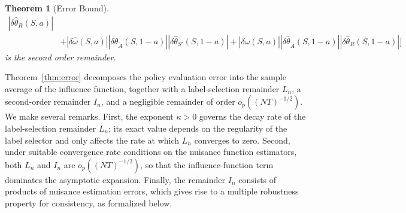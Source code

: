 \documentclass[12pt]{article}
\newcommand{\0}{\boldsymbol{0}}
\newtheorem{theorem}{Theorem}
\newcommand{\ZB}[1]{{\color{cyan}{ #1}}}
\begin{document}
\begin{theorem}[Error Bound]
\begin{align*}
|\delta\widehat\theta_R(S,a)| \\
&+
|\delta\widehat\omega(S,a)|
|\delta\widehat\theta_{\widetilde A}(S,1-a)|
|\delta\widehat\theta_{S'}(S,1-a)|
+
|\delta\widehat\omega(S,a)|
|\delta\widehat\theta_{\widetilde A}(S,1-a)|
|\delta\widehat\theta_R(S,1-a)|
\Big] 
\end{align*}
is the second order remainder.
\end{theorem}

Theorem~\ref{thm:error} decomposes the policy evaluation error into the sample average of the influence function, together with a label-selection remainder $L_n$, a second-order remainder $I_n$, and a negligible remainder of order $o_p((NT)^{-1/2})$. We make several remarks. First, the exponent $\kappa>0$ governs the decay rate of the label-selection remainder $L_n$; its exact value depends on the regularity of the label selector and only affects the rate at which $L_n$ converges to zero. Second, under suitable convergence rate conditions on the nuisance function estimators, both $L_n$ and $I_n$ are $o_p((NT)^{-1/2})$, so that the influence-function term dominates the asymptotic expansion. Finally, the remainder $I_n$ consists of products of nuisance estimation errors, which gives rise to a multiple robustness property for consistency, as formalized below.
\end{document}
